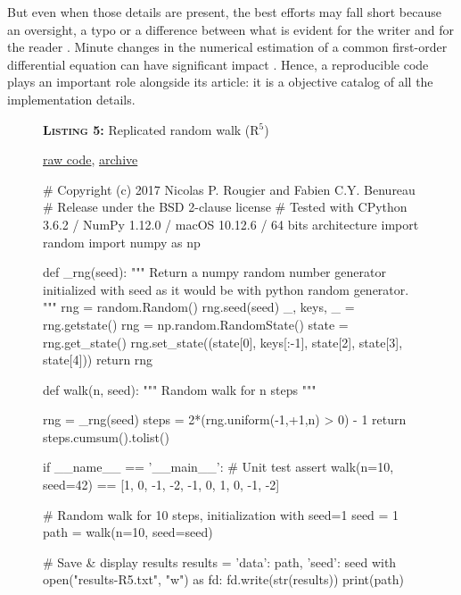 \documentclass[a4paper,11pt]{article}
\begin{document}
But even when those details are present, the best efforts may fall short because an oversight, a typo or a difference between what is evident for the writer and for the reader \citep{Mesnard:2016}. Minute changes in the numerical estimation of a common first-order differential equation can have significant impact \citep{Crook:2013}. Hence, a reproducible code plays an important role alongside its article: it is a objective catalog of all the implementation details.\\

\begin{figure}[b!]
\noindent \begin{minipage}[c]{\linewidth}
\begin{code}{\parbox{.8\textwidth}{\textbf{\textsc{Listing 5:}} Replicated random walk (R$^5$)}\parbox{.161\textwidth}{\hfill \href{https://raw.githubusercontent.com/rougier/random-walk/frontiers/random-walk-R5.py}{raw code}, \href{https://doi.org/10.5281/zenodo.848217}{archive}}}
# Copyright (c) 2017 Nicolas P. Rougier and Fabien C.Y. Benureau
# Release under the BSD 2-clause license
# Tested with CPython 3.6.2 / NumPy 1.12.0 / macOS 10.12.6 / 64 bits architecture
import random
import numpy as np

def _rng(seed):
    """ Return a numpy random number generator initialized with seed
        as it would be with python random generator.
    """
    rng = random.Random()
    rng.seed(seed)
    _, keys, _ = rng.getstate()
    rng = np.random.RandomState()
    state = rng.get_state()
    rng.set_state((state[0], keys[:-1], state[2], state[3], state[4]))
    return rng

def walk(n, seed):
    """ Random walk for n steps """

    rng = _rng(seed)
    steps = 2*(rng.uniform(-1,+1,n) > 0) - 1
    return steps.cumsum().tolist()

if __name__ == '__main__':
    # Unit test
    assert walk(n=10, seed=42) == [1, 0, -1, -2, -1, 0, 1, 0, -1, -2]

    # Random walk for 10 steps, initialization with seed=1
    seed = 1
    path = walk(n=10, seed=seed)

    # Save & display results
    results = {'data': path, 'seed': seed}
    with open("results-R5.txt", "w") as fd:
        fd.write(str(results))
    print(path)
\end{code}
\end{minipage}
\end{figure}
\end{document}
